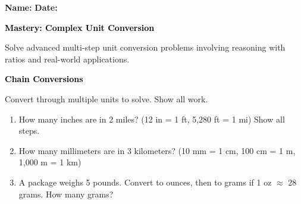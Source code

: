 \documentclass[12pt, letterpaper, fleqn]{article}
\begin{document}
\textbf{Name:} \underline{\hspace{5cm}}
\hfill
\textbf{Date:} \underline{\hspace{3cm}}\\

\begin{tcolorbox}[colback=customteal!20]
    \large\textcolor{black}{\textbf{Mastery: Complex Unit Conversion}}
\end{tcolorbox}

\vspace{3mm}

\noindent
Solve advanced multi-step unit conversion problems involving reasoning with ratios and real-world applications.

\vspace{4mm}

\begin{tcolorbox}[colback=customteal!20]
\large\textcolor{black}{\textbf{Chain Conversions}}
\end{tcolorbox}

\noindent
Convert through multiple units to solve. Show all work.

\vspace{3mm}

\begin{enumerate}[itemsep=2.2cm, leftmargin=0.6cm]

\item How many inches are in 2 miles? (12 in = 1 ft, 5,280 ft = 1 mi) Show all steps.

\vspace{2cm}

\item How many millimeters are in 3 kilometers? (10 mm = 1 cm, 100 cm = 1 m, 1,000 m = 1 km)

\vspace{2cm}

\item A package weighs 5 pounds. Convert to ounces, then to grams if 1 oz $\approx$ 28 grams. How many grams?

\vspace{2cm}

\end{enumerate}
\end{document}
